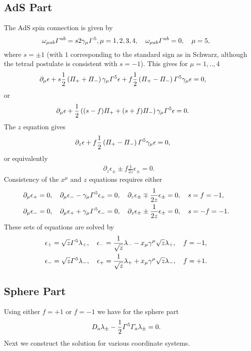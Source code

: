 \documentclass[11pt]{article}
\let\oldGamma=\Gamma
\let\oldPi=\Pi
\renewcommand{\Gamma}{\mathnormal{\oldGamma}}
\renewcommand{\Pi}{\mathnormal{\oldPi}}
\newcommand{\sfrac}[2]{{\textstyle\frac{#1}{#2}}}
\newcommand{\p}{\partial}\newcommand{\quarter}{\sfrac{1}{4}}
\begin{document}
\subsection{AdS Part}
The AdS spin connection is given by
\begin{align}
\omega_{\mu a b}\Gamma^{a b} = s 2 \gamma_\mu \Gamma^5, \mu=1,2,3,4,\quad
\omega_{\mu a b}\Gamma^{a b} =0,\quad \mu=5,
\end{align}
where $s=\pm 1$ (with $1$ corresponding to the standard sign as in Schwarz, although the tetrad postulate is consistent with $s=-1$).
This gives for $\mu=1,..,4$
\begin{align}
& \p_\mu \epsilon + s\frac{1}{2}\left(\Pi_+ + \Pi_-\right)\gamma_\mu \Gamma^5\epsilon  + f\frac{1}{2}\left(\Pi_+ - \Pi_-\right)\Gamma^5\gamma_\mu \epsilon = 0,
\end{align}
or
\begin{align}
& \p_\mu \epsilon + \frac{1}{2}\left((s-f)\Pi_+ + (s+f)\Pi_-\right)\gamma_\mu \Gamma^5\epsilon = 0.
\end{align}
The $z$ equation gives
\begin{align}
& \p_z \epsilon + f\frac{1}{2}\left(\Pi_+ - \Pi_-\right)\Gamma^5\gamma_\mu \epsilon = 0,
\end{align}
or equivalently
\begin{align}
& \p_z \epsilon_\pm \pm f\frac{1}{2z}\epsilon_\pm = 0.
\end{align}
Consistency of the $x^\mu$ and $z$ equations requires either
\begin{align}
& \p_\mu \epsilon_+ = 0,\quad
\p_\mu \epsilon_- - \gamma_\mu \Gamma^5\epsilon_+  = 0,\quad
\p_z \epsilon_\pm \mp\frac{1}{2z}\epsilon_\pm = 0,\quad s = f = -1,\nonumber\\
& \p_\mu \epsilon_- = 0,\quad
\p_\mu \epsilon_+ + \gamma_\mu \Gamma^5\epsilon_-  = 0,\quad
\p_z \epsilon_\pm \pm\frac{1}{2z}\epsilon_\pm = 0,\quad s = -f = -1.
\end{align}
These sets of equations are solved by
\begin{align}
&\epsilon_+ = \sqrt{z}\Gamma^5 \lambda_+,\quad
\epsilon_- = \frac{1}{\sqrt{z}}\lambda_- - x_\mu \gamma^\mu \sqrt{z}\lambda_+,\quad f = -1,\nonumber\\
&\epsilon_- = \sqrt{z}\Gamma^5 \lambda_-,\quad
\epsilon_+ = \frac{1}{\sqrt{z}}\lambda_+ + x_\mu \gamma^\mu \sqrt{z}\lambda_-,\quad f = +1.
\end{align}
\subsection{Sphere Part}
Using either $f=+1$ or $f=-1$ we have for the sphere part
\begin{align}
D_a \lambda_\pm-\frac{1}{2}\Gamma^5\Gamma_a \lambda_\pm = 0.
\end{align}
Next we construct the solution for various coordinate systems.
\end{document}
